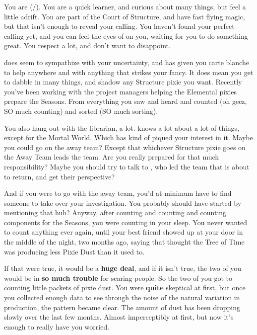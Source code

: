 \documentclass[char]{PP}
\begin{document}
\name{\cSHelp{}}

You are \cSHelp{} (\cSHelp{\They}/\cSHelp{\Them}). You are a quick learner, and curious about many things, but feel a little adrift. You are part of the Court of Structure, and have fast flying magic, but that isn’t enough to reveal your calling. You haven’t found your perfect calling yet, and you can feel the eyes of \cSHead{} on you, waiting for you to do something great. You respect \cSHead{\them} a lot, and don’t want to disappoint.

\cSHead{} does seem to sympathize with your uncertainty, and has given you carte blanche to help anywhere and with anything that strikes your fancy. It does mean you get to dabble in many things, and shadow any Structure pixie you want. Recently you’ve been working with the project managers helping the Elemental pixies prepare the Seasons. From everything you saw and heard and counted (oh geez, SO much counting) and sorted (SO much sorting).

You also hang out with the librarian, \cSLibrarian{} a lot. \cSLibrarian{} knows a lot about a lot of things, except for the Mortal World. Which has kind of piqued your interest in it. Maybe you could go on the away team? Except that whichever Structure pixie goes on the Away Team leads the team. Are you really prepared for that much responsibility? Maybe you should try to talk to \cSPM{}, who led the team that is about to return, and get their perspective?

And if you were to go with the away team, you’d at minimum have to find someone to take over your investigation. You probably should have started by mentioning that huh? Anyway, after counting and counting and counting components for the Seasons, you were counting in your sleep. You never wanted to count anything ever again, until your best friend \cMTree{} showed up at your door in the middle of the night, two months ago, saying that \cMTree{\they} thought the Tree of Time was producing less Pixie Dust than it used to. 

If that were true, it would be a \textbf{huge deal}, and if it isn’t true, the two of you would be in \textbf{so much trouble} for scaring people. So the two of you got to counting little packets of pixie dust. You were \textbf{quite} skeptical at first, but once you collected enough data to see through the noise of the natural variation in production, the pattern became clear. The amount of dust has been dropping slowly over the last few months. Almost imperceptibly at first, but now it’s enough to really have you worried.
\end{document}
